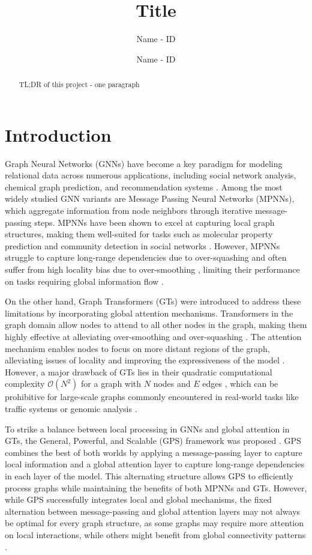 \documentclass{acmart}
\title{Title}
\author{Name - ID}
\author{Name - ID}
\date{}
\begin{document}
\begin{abstract}
TL;DR of this project - one paragraph
\end{abstract}
\maketitle

\section{Introduction}

Graph Neural Networks (GNNs) have become a key paradigm for modeling relational data across numerous applications, including social network analysis, chemical graph prediction, and recommendation systems \cite{Gilmer2017}. Among the most widely studied GNN variants are Message Passing Neural Networks (MPNNs), which aggregate information from node neighbors through iterative message-passing steps. MPNNs have been shown to excel at capturing local graph structures, making them well-suited for tasks such as molecular property prediction and community detection in social networks \cite{Gilmer2017}. However, MPNNs struggle to capture long-range dependencies due to over-squashing \cite{Alon2021} and often suffer from high locality bias due to over-smoothing \cite{Oono2020}, limiting their performance on tasks requiring global information flow \cite{Dwivedi2020}.

On the other hand, Graph Transformers (GTs) were introduced to address these limitations by incorporating global attention mechanisms. Transformers in the graph domain allow nodes to attend to all other nodes in the graph, making them highly effective at alleviating over-smoothing and over-squashing \cite{Alon2021,Topping2021}. The attention mechanism enables nodes to focus on more distant regions of the graph, alleviating issues of locality and improving the expressiveness of the model \cite{Xu2019,Morris2019}. However, a major drawback of GTs lies in their quadratic computational complexity $\mathcal{O}(N^2)$ for a graph with $N$ nodes and $E$ edges \cite{Vaswani2017}, which can be prohibitive for large-scale graphs commonly encountered in real-world tasks like traffic systems or genomic analysis \cite{Dwivedi2022,Chen2020}.

To strike a balance between local processing in GNNs and global attention in GTs, the General, Powerful, and Scalable (GPS) framework was proposed \cite{Rampasek2022}. GPS combines the best of both worlds by applying a message-passing layer to capture local information and a global attention layer to capture long-range dependencies in each layer of the model. This alternating structure allows GPS to efficiently process graphs while maintaining the benefits of both MPNNs and GTs. However, while GPS successfully integrates local and global mechanisms, the fixed alternation between message-passing and global attention layers may not always be optimal for every graph structure, as some graphs may require more attention on local interactions, while others might benefit from global connectivity patterns \cite{Bronstein2021}.
\end{document}
